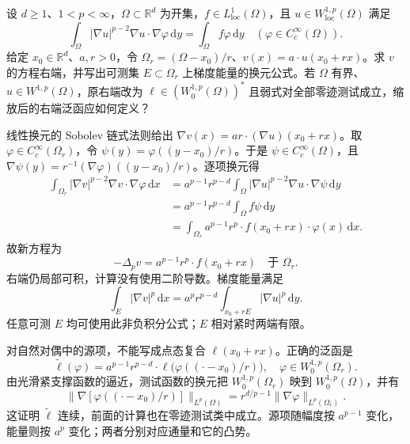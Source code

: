 \begin{exercise}\label{b2:ex:H2-scaling}
设 \(d\ge1\)、\(1<p<\infty\)，\(\Omega\subset\mathbb R^d\) 为开集，\(f\in L^1_{\mathrm{loc}}(\Omega)\)，且 \(u\in W^{1,p}_{\mathrm{loc}}(\Omega)\) 满足
\[
 \int_\Omega |\nabla u|^{p-2}\nabla u\cdot\nabla\varphi\,\mathrm dy
 =\int_\Omega f\varphi\,\mathrm dy
 \quad(\varphi\in C_c^\infty(\Omega)).
\]
给定 \(x_0\in\mathbb R^d\)、\(a,r>0\)，令
\(\Omega_r=(\Omega-x_0)/r\)、\(v(x)=a\cdot u(x_0+rx)\)。求 \(v\) 的方程右端，并写出可测集 \(E\subset\Omega_r\) 上梯度能量的换元公式。若 \(\Omega\) 有界、\(u\in W^{1,p}(\Omega)\)，原右端改为 \(\ell\in(W_0^{1,p}(\Omega))^*\) 且弱式对全部零迹测试成立，缩放后的右端泛函应如何定义？
\end{exercise}
\begin{solution}
线性换元的 Sobolev 链式法则给出
\(\nabla v(x)=ar\cdot(\nabla u)(x_0+rx)\)。取 \(\varphi\in C_c^\infty(\Omega_r)\)，令 \(\psi(y)=\varphi((y-x_0)/r)\)。于是 \(\psi\in C_c^\infty(\Omega)\)，且 \(\nabla\psi(y)=r^{-1}(\nabla\varphi)((y-x_0)/r)\)。逐项换元得
\begin{align*}
 \int_{\Omega_r}|\nabla v|^{p-2}\nabla v\cdot\nabla\varphi\,\mathrm dx
 &=a^{p-1}r^{p-d}
   \int_\Omega|\nabla u|^{p-2}\nabla u\cdot\nabla\psi\,\mathrm dy\\
 &=a^{p-1}r^{p-d}\int_\Omega f\psi\,\mathrm dy\\
 &=\int_{\Omega_r}a^{p-1}r^p\cdot f(x_0+rx)\cdot\varphi(x)\,\mathrm dx.
\end{align*}
故新方程为
\[
 -\Delta_pv=a^{p-1}r^p\cdot f(x_0+rx)
 \quad\text{于 }\Omega_r.
\]
右端仍局部可积，计算没有使用二阶导数。梯度能量满足
\[
 \int_E|\nabla v|^p\,\mathrm dx
 =a^pr^{p-d}\int_{x_0+rE}|\nabla u|^p\,\mathrm dy.
\]
任意可测 \(E\) 均可使用此非负积分公式；\(E\) 相对紧时两端有限。

对自然对偶中的源项，不能写成点态复合 \(\ell(x_0+rx)\)。正确的泛函是
\[
 \widetilde\ell(\varphi)
 =a^{p-1}r^{p-d}\cdot
  \ell\bigl(\varphi((\cdot-x_0)/r)\bigr),
 \quad \varphi\in W_0^{1,p}(\Omega_r).
\]
由光滑紧支撑函数的逼近，测试函数的换元把 \(W_0^{1,p}(\Omega_r)\) 映到 \(W_0^{1,p}(\Omega)\)，并有
\[
 \bigl\|\nabla[\varphi((\cdot-x_0)/r)]\bigr\|_{L^p(\Omega)}
 =r^{d/p-1}\|\nabla\varphi\|_{L^p(\Omega_r)}.
\]
这证明 \(\widetilde\ell\) 连续，前面的计算也在零迹测试类中成立。源项随幅度按 \(a^{p-1}\) 变化，能量则按 \(a^p\) 变化；两者分别对应通量和它的凸势。
\end{solution}

